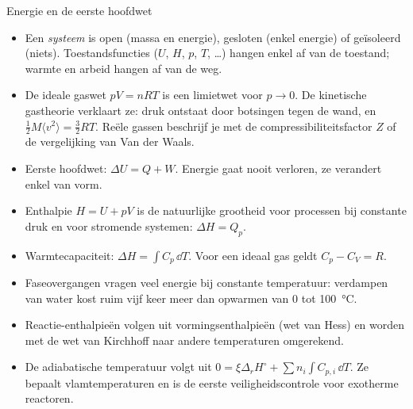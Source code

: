 \begin{samenvatting}{Energie en de eerste hoofdwet}
\begin{itemize}
\item Een \emph{systeem} is open (massa en energie), gesloten (enkel energie) of ge\"isoleerd (niets). Toestandsfuncties ($U$, $H$, $p$, $T$, \ldots) hangen enkel af van de toestand; warmte en arbeid hangen af van de weg.
\item De ideale gaswet $pV = nRT$ is een limietwet voor $p \to 0$. De kinetische gastheorie verklaart ze: druk ontstaat door botsingen tegen de wand, en $\tfrac{1}{2}M\langle v^2\rangle = \tfrac{3}{2}RT$. Re\"ele gassen beschrijf je met de compressibiliteitsfactor $Z$ of de vergelijking van Van der Waals.
\item Eerste hoofdwet: $\Delta U = Q + W$. Energie gaat nooit verloren, ze verandert enkel van vorm.
\item Enthalpie $H = U + pV$ is de natuurlijke grootheid voor processen bij constante druk en voor stromende systemen: $\Delta H = Q_p$.
\item Warmtecapaciteit: $\Delta H = \int C_p\,\dd T$. Voor een ideaal gas geldt $C_p - C_V = R$.
\item Faseovergangen vragen veel energie bij constante temperatuur: verdampen van water kost ruim vijf keer meer dan opwarmen van 0 tot \SI{100}{\celsius}.
\item Reactie-enthalpie\"en volgen uit vormingsenthalpie\"en (wet van Hess) en worden met de wet van Kirchhoff naar andere temperaturen omgerekend.
\item De adiabatische temperatuur volgt uit $0 = \xi\Delta_r H^\circ + \sum n_i\int C_{p,i}\,\dd T$. Ze bepaalt vlamtemperaturen en is de eerste veiligheidscontrole voor exotherme reactoren.
\end{itemize}
\end{samenvatting}

